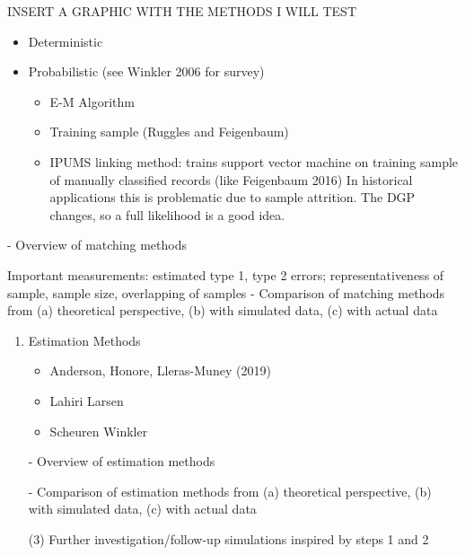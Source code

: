 \documentclass[12pt]{article}
\begin{document}
INSERT A GRAPHIC WITH THE METHODS I WILL TEST
\begin{itemize}
\item Deterministic
\item Probabilistic  (see Winkler 2006 for survey)
\begin{itemize}
\item E-M Algorithm
\item Training sample (Ruggles and Feigenbaum)
\item IPUMS linking method:  trains support vector machine on training sample of manually classified records (like Feigenbaum 2016)  In historical applications this is problematic due to sample attrition.  The DGP changes, so a full likelihood is a good idea. 
\end{itemize}
\end{itemize}
- Overview of matching methods

Important measurements:  estimated type 1, type 2 errors; representativeness of sample, sample size, overlapping of samples 
- Comparison of matching methods from (a) theoretical perspective, (b) with simulated data, (c) with actual data
\begin{enumerate}
\item  Estimation Methods 
\begin{itemize}
\item Anderson, Honore, Lleras-Muney (2019)
\item Lahiri Larsen
\item Scheuren Winkler 
\end{itemize}
- Overview of estimation methods

\bein
- Comparison of estimation methods from (a) theoretical perspective, (b) with simulated data, (c) with actual data

(3) Further investigation/follow-up simulations inspired by steps 1 and 2  
\end{enumerate}







\end{document}
